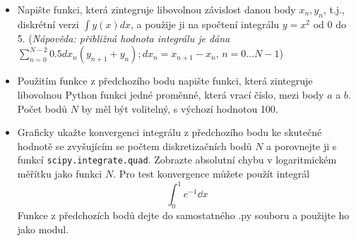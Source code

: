 \begin{exercise}
    \begin{itemize}
    \item Napište funkci, která zintegruje libovolnou závislost danou body $x_n, y_n$, t.j., diskrétní verzi $\int y(x)dx$, a použije ji na spočtení integrálu $y = x^2$ od 0 do 5. (\emph{Nápověda: přibližná hodnota integrálu je dána $\sum_{n=0}^{N-2} 0.5 dx_n(y_{n+1} + y_n); dx_n = x_{n+1} - x_n$}, $n = 0 \dots N-1$)

    \item Použitím funkce z předchozího bodu napište funkci, která zintegruje libovolnou Python funkci jedné proměnné, která vrací číslo, mezi body $a$ a $b$. Počet bodů $N$ by měl být volitelný, s výchozí hodnotou 100.

    \item Graficky ukažte konvergenci integrálu z předchozího bodu ke skutečné hodnotě se zvyšujícím se počtem diskretizačních bodů $N$ a porovnejte ji s funkcí \verb|scipy.integrate.quad|. Zobrazte absolutní chybu v logaritmickém měřítku jako funkci $N$. Pro test konvergence můžete použít integrál
    \[ \int_0^1 e^{-1} \dd x \]
    Funkce z předchozích bodů dejte do samostatného .py souboru a použijte ho jako modul.
    \end{itemize}
\end{exercise}

